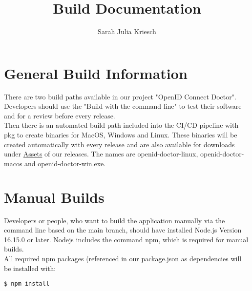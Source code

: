 \documentclass[english, letterpaper, 10 pt]{report}
\begin{document}
\title{Build Documentation}
\author{Sarah Julia Kriesch}
\maketitle
\pagestyle{empty}


\newpage
\section*{General Build Information}

There are two build paths available in our project "OpenID Connect Doctor".
Developers should use the "Build with the command line" to test their software and for a review before every release.
\\

\noindent Then there is an automated build path included into the CI/CD pipeline with pkg to create binaries for MacOS, Windows and Linux. These binaries will be created automatically with every release and are also available for downloads under \href{https://github.com/amosproj/amos2022ss08-openid-connect-doctor/releases}{Assets} of our releases. The names are openid-doctor-linux, openid-doctor-macos and openid-doctor-win.exe.


\section*{Manual Builds}

Developers or people, who want to build the application manually via the command line based on the main branch, should have installed Node.js Version 16.15.0 or later. Nodejs includes the command npm, which is required for manual builds.
\\

\noindent All required npm packages (referenced in our \href{https://github.com/amosproj/amos2022ss08-openid-connect-doctor/blob/main/package.json}{package.json} as dependencies will be installed with:

\begin{lstlisting}[frame=single]
  $ npm install
\end{lstlisting}
\end{document}
